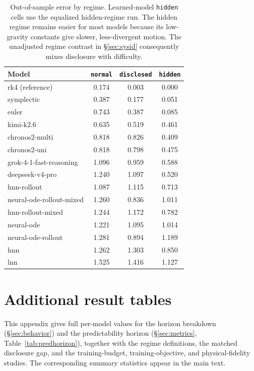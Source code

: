 \documentclass{article}
\begin{document}
\begin{table}[tbp]
\centering\small
\caption{Out-of-sample error by regime. Learned-model \texttt{hidden} cells use the
equalized hidden-regime run. The hidden regime remains easier for most models
because its low-gravity constants give slower, less-divergent motion. The unadjusted
regime contrast in \S\ref{sec:sysid} consequently mixes disclosure with difficulty.}
\label{tab:perregime}
\begin{tabular}{lccc}
\toprule
Model & \texttt{normal} & \texttt{disclosed} & \texttt{hidden} \\
\midrule
rk4 (reference) & 0.174 & 0.003 & 0.000 \\
symplectic & 0.387 & 0.177 & 0.051 \\
euler & 0.743 & 0.387 & 0.085 \\
kimi-k2.6 & 0.635 & 0.519 & 0.461 \\
chronos2-multi & 0.818 & 0.826 & 0.409 \\
chronos2-uni & 0.818 & 0.798 & 0.475 \\
grok-4-1-fast-reasoning & 1.096 & 0.959 & 0.588 \\
deepseek-v4-pro & 1.240 & 1.097 & 0.520 \\
hnn-rollout & 1.087 & 1.115 & 0.713 \\
neural-ode-rollout-mixed & 1.260 & 0.836 & 1.011 \\
hnn-rollout-mixed & 1.244 & 1.172 & 0.782 \\
neural-ode & 1.221 & 1.095 & 1.014 \\
neural-ode-rollout & 1.281 & 0.894 & 1.189 \\
hnn & 1.262 & 1.303 & 0.850 \\
lnn & 1.525 & 1.416 & 1.127 \\
\bottomrule
\end{tabular}
\end{table}

\section{Additional result tables}
\label{app:extra}
This appendix gives full per-model values for the horizon breakdown (\S\ref{sec:behavior}) and
the predictability horizon (\S\ref{sec:metrics}, Table~\ref{tab:predhorizon}), together with the
regime definitions, the matched disclosure gap, and the training-budget, training-objective, and
physical-fidelity studies. The corresponding summary statistics appear in the main text.
\end{document}
